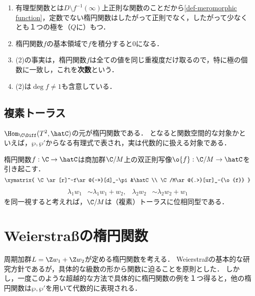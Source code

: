 \documentclass[uplatex, dvipdfmx]{jsreport}
\begin{document}
\begin{remarks}\mbox{}
    \begin{enumerate}
        \item 有理型関数とは$D\setminus f^{-1}(\infty)$上正則な関数のことだから\ref{def-meromorphic function}，定数でない楕円関数はしたがって正則でなく，したがって少なくとも１つの極を（$Q$に）もつ．
        \item 楕円関数$f$の基本領域で$f$を積分すると$0$になる．
        \item (2)の事実は，楕円関数$f$は全ての値を同じ重複度だけ取るので，特に極の個数に一致し，これを\textbf{次数}という．
        \item (2)は$\deg f\ne 1$も含意している．
    \end{enumerate}
\end{remarks}

\subsection{複素トーラス}

\begin{tcolorbox}[colframe=ForestGreen, colback=ForestGreen!10!white,breakable,colbacktitle=ForestGreen!40!white,coltitle=black,fonttitle=\bfseries\sffamily,
title=]
    $\Hom_{\C\Diff}(T^2,\hatC)$の元が楕円関数である．
    となると関数空間的な対象かといえば，$\wp,\wp'$からなる有理式で表され，実は代数的に扱える対象である．
\end{tcolorbox}

楕円関数$f:\C\to\hatC$は商加群$\C/M$上の双正則写像$\o{f}:\C/M\to\hatC$を引き起こす．
\[\xymatrix{
    \C\ar[r]^-f\ar@{->>}[d]_-\pi&\hatC\\
    \C/M\ar@{.>}[ur]_-{\o{f}}
}\]
\begin{align*}
    \lambda_1w_1&\sim\lambda_1w_1+w_2,&\lambda_2w_2&\sim\lambda_2w_2+w_1
\end{align*}
を同一視すると考えれば，$\C/M$は（複素）トーラスに位相同型である．

\section{Weierstraßの楕円関数}

\begin{tcolorbox}[colframe=ForestGreen, colback=ForestGreen!10!white,breakable,colbacktitle=ForestGreen!40!white,coltitle=black,fonttitle=\bfseries\sffamily,
title=]
    周期加群$L=\Z w_1+\Z w_2$が定める楕円関数を考える．
    Weierstraßの基本的な研究方針であるが，具体的な級数の形から関数に迫ることを原則とした．
    しかし，一度このような超越的な方法で具体的に楕円関数の例を１つ得ると，他の楕円関数は$\wp,\wp'$を用いて代数的に表現される．
\end{tcolorbox}
\end{document}
